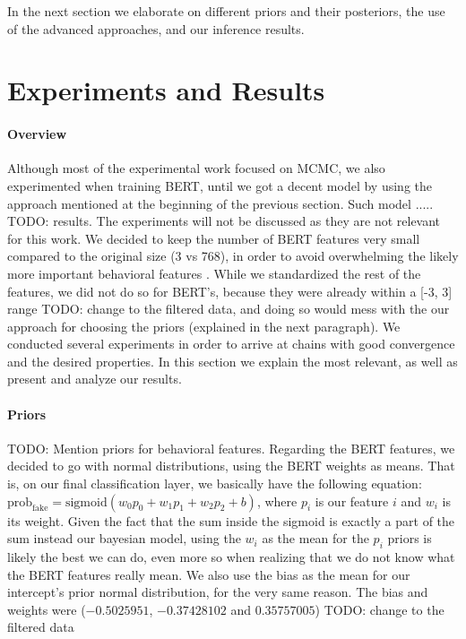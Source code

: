 \documentclass[man, floatsintext, 10pt]{apa6}
\begin{document}
In the next section we elaborate on different priors and their posteriors, the use of the advanced approaches, and our inference results.

\section{Experiments and Results}

\paragraph{Overview} Although most of the experimental work focused on MCMC, we also experimented when training BERT, until we got a decent model by using the approach mentioned at the beginning of the previous section. Such model ..... TODO: results. The experiments will not be discussed as they are not relevant for this work. We decided to keep the number of BERT features very small compared to the original size (3 vs 768), in order to avoid overwhelming the likely more important behavioral features . While we standardized the rest of the features, we did not do so for BERT's, because they were already within a [-3, 3] range TODO: change to the filtered data, and doing so would mess with the our approach for choosing the priors (explained in the next paragraph). We conducted several experiments in order to arrive at chains with good convergence and the desired properties. In this section we explain the most relevant, as well as present and analyze our results. 

\vspace{2mm}

\paragraph{Priors} TODO: Mention priors for behavioral features. Regarding the BERT features, we decided to go with normal distributions, using the BERT weights as means. That is, on our final classification layer, we basically have the following equation: $\text{prob}_{\text{fake}} = \text{sigmoid} (w_0 p_0 + w_1 p_1 + w_2 p_2 + b)$, where $p_i$ is our feature $i$ and $w_i$ is its weight. Given the fact that the sum inside the sigmoid is exactly a part of the sum instead our bayesian model, using the $w_i$ as the mean for the $p_i$ priors is likely the best we can do, even more so when realizing that we do not know what the BERT features really mean. We also use the bias as the mean for our intercept's prior normal distribution, for the very same reason. The bias and weights were ($-0.5025951$, $-0.37428102$ and $0.35757005$) TODO: change to the filtered data
\end{document}
